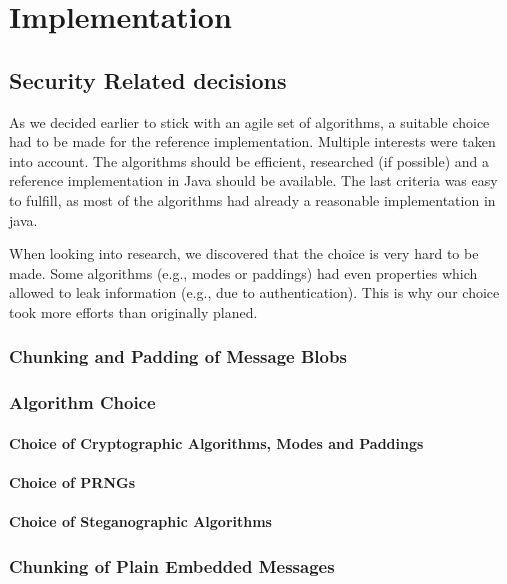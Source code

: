 
\part{Implementation\label{sec:implementation}}

\chapter{Security Related decisions}
As we decided earlier to stick with an agile set of algorithms, a suitable choice had to be made for the reference implementation. Multiple interests were taken into account. The algorithms should be efficient, researched (if possible) and a reference implementation in Java should be available. The last criteria was easy to fulfill, as most of the algorithms had already a reasonable implementation in java.

When looking into research, we discovered that the choice is very hard to be made. Some algorithms (e.g., modes or paddings) had even properties which allowed to leak information (e.g., due to authentication). This is why our choice took more efforts than originally planed.

\section{Chunking and Padding of Message Blobs}

	
\section{Algorithm Choice}
\subsection{Choice of Cryptographic Algorithms, Modes and Paddings}
\subsection{Choice of PRNGs}
\subsection{Choice of Steganographic Algorithms}
\section{Chunking of Plain Embedded Messages}\label{sec:chunkingPlain}

